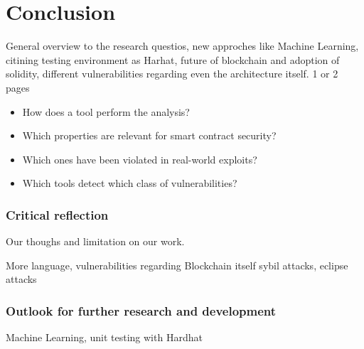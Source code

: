 
\chapter{Conclusion}
\label{ch:Conclusion}
General overview to the research questios, new approches like Machine Learning, citining testing environment as Harhat, 
future of blockchain and adoption of solidity, different vulnerabilities regarding even the architecture itself. 
1 or 2 pages
\begin{itemize}
    \item How does a tool perform the analysis? 
    \item Which properties are relevant for smart contract security?
    \item Which ones have been violated in real-world exploits? 
    \item Which tools detect which class of vulnerabilities? 
\end{itemize}

\subsection{Critical reﬂection}
Our thoughs and limitation on our work. 

More language, vulnerabilities regarding Blockchain itself sybil attacks, eclipse attacks
\subsection{Outlook for further research and development}
Machine Learning, unit testing with Hardhat